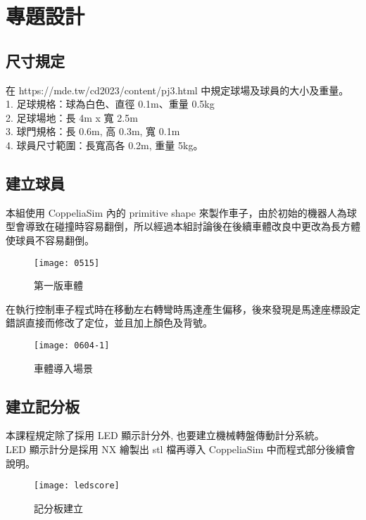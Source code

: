 \chapter{專題設計}
\renewcommand{\baselinestretch}{10.0} %
\setcounter{page}{2}  %
\fontsize{14pt}{2.5pt}\sectionef

\section{尺寸規定}
在 https://mde.tw/cd2023/content/pj3.html 中規定球場及球員的大小及重量。\\
1. 足球規格：球為白色、直徑 0.1m、重量 0.5kg\\
2. 足球場地：長 4m x 寬 2.5m\\
3. 球門規格：長 0.6m, 高 0.3m, 寬 0.1m\\
4. 球員尺寸範圍：長寬高各 0.2m, 重量 5kg。\\

\section{建立球員}
本組使用 CoppeliaSim 內的 primitive shape 來製作車子，由於初始的機器人為球型會導致在碰撞時容易翻倒，所以經過本組討論後在後續車體改良中更改為長方體使球員不容易翻倒。\\
\begin{figure}[hbt!]
\begin{center}
\texttt{[image: 0515]}
\caption{\Large 第一版車體}\label{車體}
\end{center}
\end{figure}

在執行控制車子程式時在移動左右轉彎時馬達產生偏移，後來發現是馬達座標設定錯誤直接而修改了定位，並且加上顏色及背號。\\
\begin{figure}[hbt!]
\begin{center}
\texttt{[image: 0604-1]}
\caption{\Large 車體導入場景}\label{車體導入場景}
\end{center}
\end{figure}

\section{建立記分板}
本課程規定除了採用 LED 顯示計分外, 也要建立機械轉盤傳動計分系統。\\
LED 顯示計分是採用 NX 繪製出 stl 檔再導入 CoppeliaSim 中而程式部分後續會說明。\\
\begin{figure}[hbt!]
\begin{center}
\texttt{[image: ledscore]}
\caption{\Large 記分板建立}\label{記分板建立}
\end{center}
\end{figure}

